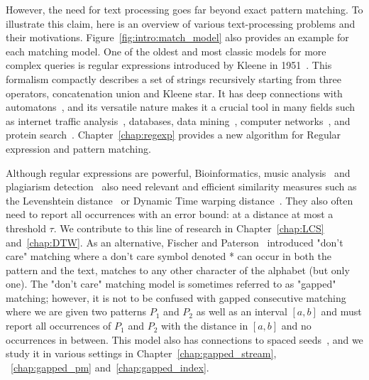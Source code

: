 However, the need for text processing goes far beyond exact pattern matching. To illustrate this claim, here is an overview of various text-processing problems and their motivations. Figure~\ref{fig:intro:match_model} also provides an example for each matching model.
One of the oldest and most classic models for more complex queries is regular expressions introduced by Kleene in 1951~\cite{RM-704}.
This formalism compactly describes a set of strings recursively starting from three operators, concatenation union and Kleene star.
It has deep connections with automatons~\cite{Thompson_automaton}, and its versatile nature makes it a crucial tool in many fields such as internet traffic analysis~\cite{4221791,4579527}, databases, data mining~\cite{1000341,10.5555/645927.672035,10.1145/375551.375569}, computer networks~\cite{10.1145/1159913.1159952}, and protein search~\cite{10.1145/369133.369220}. Chapter~\ref{chap:regexp} provides a new algorithm for Regular expression and pattern matching.

Although regular expressions are powerful, Bioinformatics\cite{Gusfield1997}, music analysis~\cite{mongeau1990comparison} and plagiarism detection~\cite{lukashenko2007computer} also need relevant and efficient similarity measures such as the Levenshtein distance~\cite{levenshtein1966binary} or Dynamic Time warping distance~\cite{sakoe1978dynamic}. They also often need to report all occurrences with an error bound\cite{landau1986efficient,landau1989fast}: at a distance at most a threshold $\tau$.
We contribute to this line of research in Chapter~\ref{chap:LCS} and~\ref{chap:DTW}.
As an alternative, Fischer and Paterson~\cite{fischer1974string} introduced "don't care" matching where a don't care symbol denoted * can occur in both the pattern and the text, matches to any other character of the alphabet (but only one).
The "don't care" matching model is sometimes referred to as "gapped" matching; however, it is not to be confused with gapped consecutive matching~\cite{bille2022gapped} where we are given two patterns $P_1$ and $P_2$ as well as an interval $[a,b]$ and must report all occurrences of $P_1$ and $P_2$ with the distance in $[a,b]$ and no occurrences in between. This model also has connections to spaced seeds~\cite{burkhardt2003better}, and we study it in various settings in Chapter~\ref{chap:gapped_stream}, ~\ref{chap:gapped_pm} and~\ref{chap:gapped_index}.

